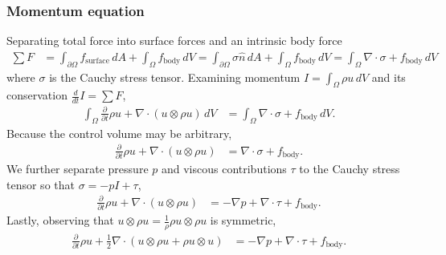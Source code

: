 \documentclass[letterpaper,11pt,nointlimits]{amsart}
\begin{document}
\subsubsection{Momentum equation} 
Separating total force into surface forces and an intrinsic body force
\begin{align}
  \sum{}F
  &= 
     \int_{\partial\Omega} f_\text{surface} \, dA 
   + \int_{\Omega} f_\text{body} \, dV 
  = 
     \int_{\partial\Omega} \sigma \hat{n} \, dA 
  +  \int_{\Omega} f_\text{body} \, dV 
  =  \int_{\Omega} \nabla\cdot\sigma + f_\text{body} \, dV 
\end{align}
where $\sigma$ is the Cauchy stress tensor.  Examining
momentum $I=\int_{\Omega} \rho{}u\,dV$ and its conservation
$\frac{d}{dt}I=\sum{}F$,
\begin{align}
    \int_{\Omega}\frac{\partial{}}{\partial{}t}\rho{}u
  + \nabla\cdot(u\otimes{}\rho{}u)\,dV
&= \int_{\Omega} \nabla\cdot\sigma + f_\text{body} \, dV 
.
\end{align}
Because the control volume may be arbitrary, 
\begin{align}
  \frac{\partial{}}{\partial{}t}\rho{}u + \nabla\cdot(u\otimes{}\rho{}u) 
&= \nabla\cdot\sigma + f_\text{body}
.
\end{align}
We further separate pressure $p$ and viscous contributions $\tau$ to
the Cauchy stress tensor so that $\sigma = -p I + \tau$,
\begin{align}
\frac{\partial{}}{\partial{}t}\rho{}u + \nabla\cdot(u\otimes{}\rho{}u) 
&= -\nabla{}p + \nabla\cdot{}\tau + f_\text{body}
.
\end{align}
Lastly, observing that $u\otimes\rho{}u = \frac{1}{\rho}\rho{}u\otimes\rho{}u$
is symmetric,
\begin{align}
\label{eq:cons_momentum}
\frac{\partial{}}{\partial{}t}\rho{}u 
+ \frac{1}{2}\nabla\cdot(u\otimes{}\rho{}u + \rho{}u\otimes{}u) 
&= -\nabla{}p + \nabla\cdot{}\tau + f_\text{body}
.
\end{align}
\end{document}
